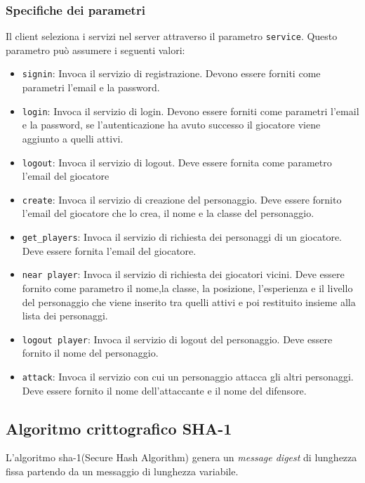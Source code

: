 \documentclass[12pt,a4]{article}
\begin{document}
\subsubsection{Specifiche dei parametri}
Il client seleziona i servizi nel server attraverso il parametro \texttt{service}. Questo parametro può assumere i seguenti valori:\\
\begin{itemize}
\item  \texttt{signin}: Invoca il servizio di registrazione. Devono essere forniti come parametri l'email e la password.

\item  \texttt{login}: Invoca il servizio di login. Devono essere forniti come parametri l'email e la password, se l'autenticazione ha avuto successo il giocatore viene aggiunto a quelli attivi.

\item \texttt{logout}: Invoca il servizio di logout. Deve essere fornita come parametro l'email del giocatore

\item \texttt{create}: Invoca il servizio di creazione del personaggio. Deve essere fornito l'email del giocatore che lo crea, il nome e la classe del personaggio.

\item \texttt{get\_players}: Invoca il servizio di richiesta dei personaggi di un giocatore. Deve essere fornita l'email del giocatore.

\item \texttt{near player}: Invoca il servizio di richiesta dei giocatori vicini. Deve essere fornito come parametro il nome,la classe, la posizione, l'esperienza e il livello del personaggio che viene inserito tra quelli attivi e poi restituito insieme alla lista dei personaggi.

\item \texttt{logout player}: Invoca il servizio di logout del personaggio. Deve essere fornito il nome del personaggio.

\item \texttt{attack}: Invoca il servizio con cui un personaggio attacca gli altri personaggi. Deve essere fornito il nome dell'attaccante e il nome del difensore.

\end{itemize}

\subsection{Algoritmo crittografico SHA-1}
L'algoritmo sha-1(Secure Hash Algorithm) genera un \textit{message digest} di lunghezza fissa partendo da un messaggio di lunghezza variabile.
\end{document}
